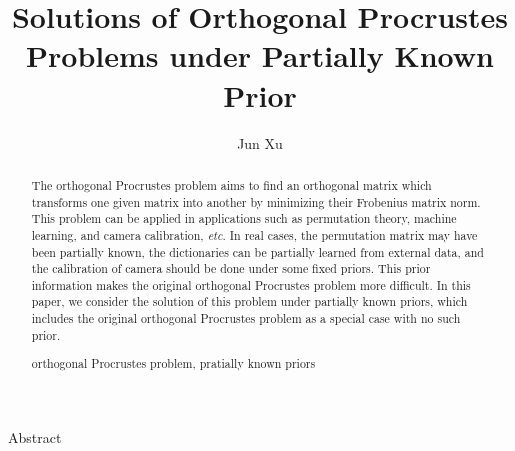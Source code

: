 \documentclass[titlepage,11pt,twoside]{article}
\begin{document}

\title{Solutions of Orthogonal Procrustes Problems under Partially Known  Prior}

\author{Jun Xu }






\begin{center}\vskip3pt


\vspace{32pt}

Abstract\vskip3pt

\end{center}


\begin{abstract}
The orthogonal Procrustes problem aims to find an orthogonal matrix which transforms one given matrix into another by minimizing their Frobenius matrix norm. This problem can be applied in applications such as permutation theory, machine learning, and camera calibration, \emph{etc}. In real cases, the permutation matrix may have been partially known, the dictionaries can be partially learned from external data, and the calibration of camera should be done under some fixed priors. This prior information makes the original orthogonal Procrustes problem more difficult. In this paper, we consider the solution of this problem under partially known priors, which includes the original orthogonal Procrustes problem as a special case with no such prior.
\begin{keywords}
orthogonal Procrustes problem, pratially known priors
\end{keywords}
\end{abstract}
\end{document}

